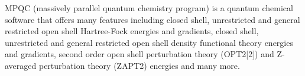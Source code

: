 MPQC (massively parallel quantum chemistry program) is a quantum chemical software that offers many features including closed shell, unrestricted and general restricted open shell Hartree-Fock energies and gradients, closed shell, unrestricted and general restricted open shell density functional theory energies and gradients, second order open shell perturbation theory (OPT2[2]) and Z-averaged perturbation theory (ZAPT2) energies and many more.